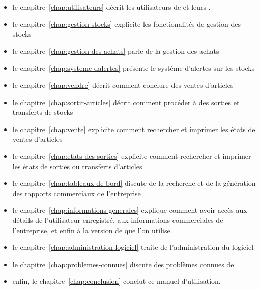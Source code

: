 \begin{itemize}[]
	\item le chapitre~\ref{chap:utilisateurs} d\'ecrit
	les utilisateurs de \yeren et leurs \roles. 
	     
	\item le chapitre~\ref{chap:gestion-stocks} explicite
	les fonctionalit\'es de gestion des stocks

	\item le chapitre~\ref{chap:gestion-des-achats} parle
	de la gestion des achats
	
	\item le chapitre~\ref{chap:systeme-dalertes}
	pr\'esente le syst\`eme d'alertes sur les stocks
	
	\item le chapitre~\ref{chap:vendre} d\'ecrit comment
	conclure des ventes d'articles
	
	\item le chapitre~\ref{chap:sortir-articles} d\'ecrit
	comment proc\'eder \`a des sorties et transferts de stocks
	
	\item le chapitre~\ref{chap:vente} explicite comment
	rechercher et imprimer les \'etats de ventes d'articles
	
	\item le chapitre~\ref{chap:etats-des-sorties} explicite
	comment rechercher et imprimer les \'etats de sorties ou
	transferts d'articles
	
	\item le chapitre~\ref{chap:tableaux-de-bord} discute
	de la recherche et de la g\'en\'eration des rapports
	commerciaux de l'entreprise
	
	\item le chapitre~\ref{chap:informations-generales}
	explique comment avoir acc\`es aux d\'etails de
	l'utilisateur enregistr\'e, aux informations commerciales
	de l'entreprise, et enfin \`a la version de \yeren que
	l'on utilise
	
	\item le chapitre~\ref{chap:administration-logiciel}
	traite de l'administration du logiciel

	\item le chapitre~\ref{chap:problemes-connues}
	discute des probl\`emes connues de \yeren
	
	\item enfin, le chapitre~\ref{chap:conclusion} conclut
	ce manuel d'utilisation.
\end{itemize}

